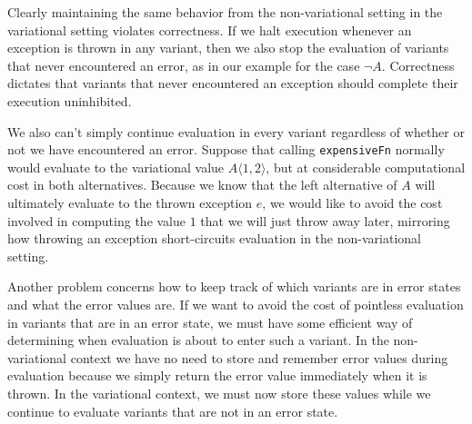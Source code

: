 \documentclass[letterpaper,10pt,onecolumn]{article}
\newcommand{\tagtree}[3]{#1 \langle #2, #3 \rangle}
\begin{document}
Clearly maintaining the same behavior from the non-variational setting in the variational setting
violates correctness. If we halt execution whenever an exception is
thrown in any variant, then we also stop the evaluation of variants that never encountered an error,
as in our example for the case $\neg A$. Correctness dictates that variants that never encountered
an exception should complete their execution uninhibited.

We also can't simply continue evaluation
in every variant regardless of whether or not we have encountered an error.
Suppose that calling \texttt{expensiveFn} normally would evaluate to the variational value $\tagtree{A}{1}{2}$, but at considerable computational cost in both alternatives.
Because we know that the left alternative of $A$ will ultimately evaluate to the thrown exception $e$, we would
like to avoid the cost involved in computing the value $1$ that we will just throw away later, mirroring how throwing an exception short-circuits evaluation in the
non-variational setting. 

Another problem concerns how to keep track of which variants are in error states and what
the error values are. If we want to avoid the cost of pointless evaluation in variants that are in an error
state, we must have some efficient way of determining when evaluation is about to enter such a variant.
In the non-variational context we have no need to store and remember error values during evaluation
because we simply return the error value immediately when it is thrown. In the variational context, we
must now store these values while we continue to evaluate variants that are not in an error state.



\end{document}
